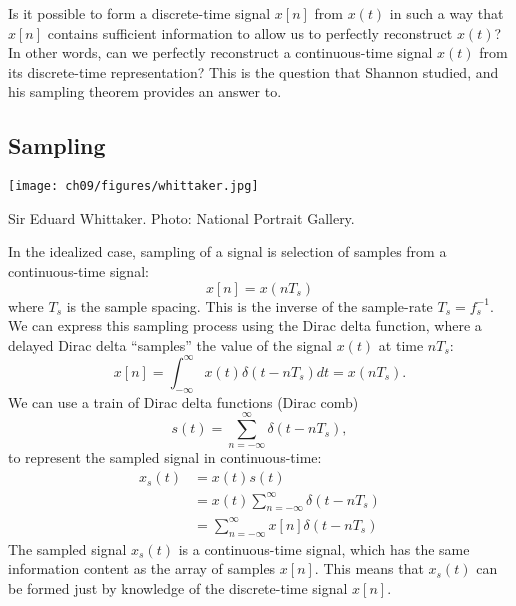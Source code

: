 Is it possible to form a discrete-time signal $x[n]$ from $x(t)$ in such a way that $x[n]$ contains sufficient information to
allow us to perfectly reconstruct $x(t)$? In other words, can we perfectly reconstruct a continuous-time signal $x(t)$ from
its discrete-time representation? This is the question that Shannon studied, and his sampling theorem provides an answer to.

\subsection{Sampling}
\begin{marginfigure}[3cm]
  \begin{center}
    \texttt{[image: ch09/figures/whittaker.jpg]}
  \end{center}
  \caption{Sir Eduard Whittaker. Photo: National Portrait Gallery.}
\end{marginfigure}

In the idealized case, sampling of a signal is selection of samples from a continuous-time signal:
\begin{equation}
  x[n] = x(nT_s)
\end{equation}
where $T_s$ is the sample spacing. This is the inverse of the sample-rate $T_s = f_s^{-1}$. 
We can express this sampling process using the Dirac delta function, 
where a delayed Dirac delta ``samples'' the value of the signal $x(t)$ at time $nT_s$:
\begin{equation}
  x[n] = \int_{-\infty}^{\infty}x(t)\delta(t-nT_s)dt = x(nT_s).
\end{equation}
We can use a train of Dirac delta functions (Dirac comb)
\begin{equation}
  s(t) = \sum_{n=-\infty}^{\infty}\delta(t-nT_s),
\end{equation}
to represent the sampled signal in continuous-time:
\begin{align}
  x_s(t) & = x(t) s(t)                                     \\
         & = x(t) \sum_{n=-\infty}^{\infty} \delta(t-nT_s) \\
         & = \sum_{n=-\infty}^{\infty} x[n]\delta(t-nT_s)
\end{align}
The sampled signal $x_s(t)$ is a continuous-time signal, which has the same information 
content as the array of samples $x[n]$. This means that $x_s(t)$ can be formed just by 
knowledge of the discrete-time signal $x[n]$.

